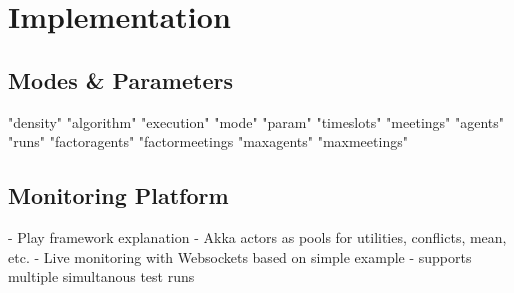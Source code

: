 \chapter{Implementation}


\section{Modes \& Parameters}

"density"
"algorithm"
"execution"
"mode"
"param"
"timeslots"
"meetings"
"agents"
"runs"
"factoragents"
"factormeetings
"maxagents"
"maxmeetings"


\section{Monitoring Platform}

- Play framework explanation
- Akka actors as pools for utilities, conflicts, mean, etc.
- Live monitoring with Websockets based on simple example
- supports multiple simultanous test runs